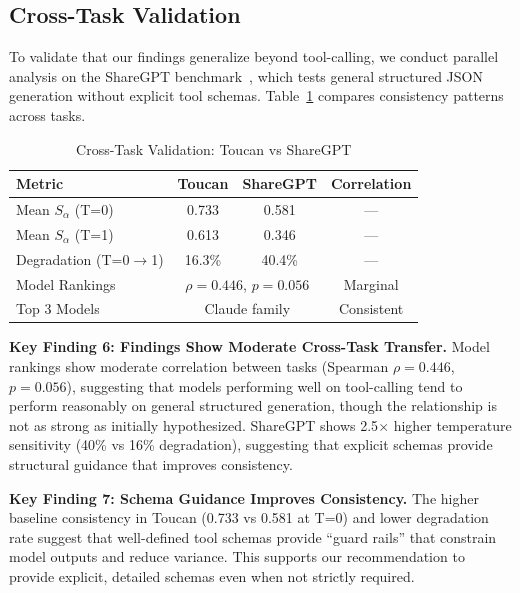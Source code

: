\documentclass[sigconf,anonymous,review]{acmart}
\begin{document}
\subsection{Cross-Task Validation}

To validate that our findings generalize beyond tool-calling, we conduct parallel analysis on the ShareGPT benchmark~\cite{sharegpt2023}, which tests general structured JSON generation without explicit tool schemas. Table~\ref{tab:cross_task} compares consistency patterns across tasks.

\begin{table}[t]
\centering
\caption{Cross-Task Validation: Toucan vs ShareGPT}
\label{tab:cross_task}
\small
\begin{tabular}{@{}lccc@{}}
\toprule
\textbf{Metric} & \textbf{Toucan} & \textbf{ShareGPT} & \textbf{Correlation} \\
\midrule
Mean $S_\alpha$ (T=0) & 0.733 & 0.581 & --- \\
Mean $S_\alpha$ (T=1) & 0.613 & 0.346 & --- \\
Degradation (T=0$\rightarrow$1) & 16.3\% & 40.4\% & --- \\
Model Rankings & \multicolumn{2}{c}{$\rho = 0.446$, $p = 0.056$} & Marginal \\
Top 3 Models & \multicolumn{2}{c}{Claude family} & Consistent \\
\bottomrule
\end{tabular}
\end{table}

\textbf{Key Finding 6: Findings Show Moderate Cross-Task Transfer.} Model rankings show moderate correlation between tasks (Spearman $\rho = 0.446$, $p = 0.056$), suggesting that models performing well on tool-calling tend to perform reasonably on general structured generation, though the relationship is not as strong as initially hypothesized. ShareGPT shows 2.5$\times$ higher temperature sensitivity (40\% vs 16\% degradation), suggesting that explicit schemas provide structural guidance that improves consistency.

\textbf{Key Finding 7: Schema Guidance Improves Consistency.} The higher baseline consistency in Toucan (0.733 vs 0.581 at T=0) and lower degradation rate suggest that well-defined tool schemas provide ``guard rails'' that constrain model outputs and reduce variance. This supports our recommendation to provide explicit, detailed schemas even when not strictly required.

\end{document}
